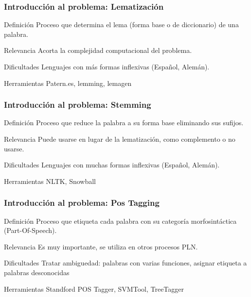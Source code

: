 \documentclass{beamer}
\begin{document}
\begin{frame}
\frametitle{Introducción al problema: Lematización}
\begin{block}{Definición}
Proceso que determina el lema (forma base o de diccionario) de una palabra. 
\end{block}
\begin{block}{Relevancia}
Acorta la complejidad computacional del problema.
\end{block}
\begin{block}{Dificultades}
Lenguajes con más formas inflexivas (Español, Alemán).
\end{block}
\begin{block}{Herramientas}
Patern.es, lemming, lemagen
\end{block}
\end{frame}

\begin{frame}
\frametitle{Introducción al problema: Stemming}
\begin{block}{Definición}
Proceso que reduce la palabra a su forma base eliminando sus sufijos. 
\end{block}
\begin{block}{Relevancia}
Puede usarse en lugar de la lematización, como complemento o no usarse.
\end{block}
\begin{block}{Dificultades}
Lenguajes con muchas formas inflexivas (Español, Alemán).
\end{block}
\begin{block}{Herramientas}
NLTK, Snowball
\end{block}
\end{frame}

\begin{frame}
\frametitle{Introducción al problema: Pos Tagging}
\begin{block}{Definición}
Proceso que etiqueta cada palabra con su categoría morfosintáctica (Part-Of-Speech). 
\end{block}
\begin{block}{Relevancia}
Es muy importante, se utiliza en otros procesos PLN.
\end{block}
\begin{block}{Dificultades}
Tratar ambiguedad: palabras con varias funciones, asignar etiqueta a palabras desconocidas
\end{block}
\begin{block}{Herramientas}
Standford POS Tagger, SVMTool, TreeTagger
\end{block}
\end{frame}
\end{document}
